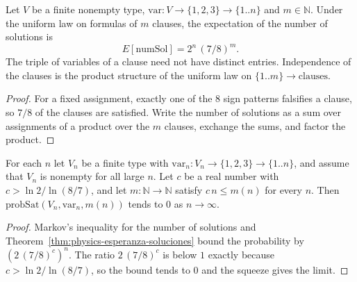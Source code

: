 \begin{theorem}
  \label{thm:physics-esperanza-soluciones}
  \leanok
  Let $V$ be a finite nonempty type, $\mathrm{var} : V \to \{1,2,3\} \to \{1..n\}$ and
  $m \in \mathbb{N}$. Under the uniform law on formulas of $m$ clauses, the expectation of the
  number of solutions is
  \[
    E[\mathrm{numSol}] = 2^{n}\,(7/8)^{m}.
  \]
  The triple of variables of a clause need not have distinct entries. Independence of the clauses
  is the product structure of the uniform law on $\{1..m\} \to \text{clauses}$.
\end{theorem}

\begin{proof}
  \leanok
  For a fixed assignment, exactly one of the $8$ sign patterns falsifies a clause, so $7/8$ of the
  clauses are satisfied. Write the number of solutions as a sum over assignments of a product over
  the $m$ clauses, exchange the sums, and factor the product.
\end{proof}

\begin{theorem}
  \label{thm:physics-prob-sat-tiende-cero}
  \leanok
  For each $n$ let $V_n$ be a finite type with $\mathrm{var}_n : V_n \to \{1,2,3\} \to \{1..n\}$,
  and assume that $V_n$ is nonempty for all large $n$. Let $c$ be a real number with
  $c > \ln 2 / \ln (8/7)$, and let $m : \mathbb{N} \to \mathbb{N}$ satisfy $c\,n \le m(n)$ for
  every $n$. Then $\mathrm{probSat}(V_n, \mathrm{var}_n, m(n))$ tends to $0$ as $n \to \infty$.
\end{theorem}

\begin{proof}
  \leanok
  Markov's inequality for the number of solutions and Theorem~\ref{thm:physics-esperanza-soluciones}
  bound the probability by $(2\,(7/8)^c)^n$. The ratio $2\,(7/8)^c$ is below $1$ exactly because
  $c > \ln 2 / \ln (8/7)$, so the bound tends to $0$ and the squeeze gives the limit.
\end{proof}


